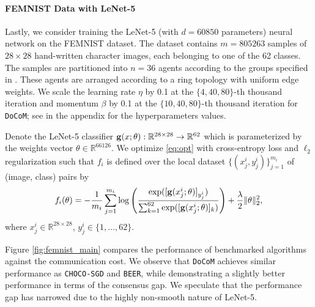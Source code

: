 \documentclass[10pt]{article} %
\newcommand{\revision}{}
\theoremstyle{plain}
\theoremstyle{definition}
\theoremstyle{remark}
\newcommand{\aname}{{\tt DoCoM}}
\begin{document}
\paragraph{FEMNIST Data with LeNet-5}
Lastly, we consider training the LeNet-5 (with $d=60850$ parameters) neural network on the FEMNIST dataset. The dataset contains $m=805263$ samples of $28 \times 28$ hand-written character images, each belonging to one of the 62 classes. The samples are partitioned into $n=36$ agents according to the groups specified in \citep{caldas2019leaf}. These agents are arranged according to a ring topology with uniform edge weights.
We scale the learning rate $\eta$ by 0.1 at the {\revision $\{4, 40, 80\}$-th} thousand iteration and momentum $\beta$ by 0.1 at the {\revision $\{10, 40, 80 \}$-th} thousand iteration {\revision for {\aname}}; see  in the appendix for the hyperparameters values.\vspace{-.1cm}

{\revision
Denote the LeNet-5 classifier ${\bf g} (x; \theta): \mathbb{R}^{28\times 28} \rightarrow \mathbb{R}^{62}$ which is parameterized by the weights vector $\theta \in \mathbb{R}^{66126}$. We optimize \eqref{eq:opt} with cross-entropy loss and $\ell_2$ regularization such that $f_i$ is defined over the local dataset $\{(x_j^i,y_j^i) \}_{j=1}^{m_i}$ of (image, class) pairs by
\begin{equation}
    f_i(\theta) = - \frac{1}{m_i} \sum_{j=1}^{m_i} \log\left(\frac{\exp( [{\bf g} (x_j^i; \theta) ]_{y_j^i})}{\sum_{k=1}^{62} \exp( [ {\bf g} (x_j^i; \theta) ]_k )} \right) + \frac{\lambda}{2} \| \theta\|_2^2,
\end{equation}
where $x_j^i \in \mathbb{R}^{28 \times 28}$, $y_j^i \in \{1, \ldots ,62\}$.
}

Figure \ref{fig:femnist_main} compares the performance of benchmarked algorithms against the communication cost. We observe that {\aname} achieves similar performance as {\tt CHOCO-SGD} and {\tt BEER}, while demonstrating a slightly better performance in terms of the consensus gap. 
We speculate that the performance gap has narrowed due to the highly non-smooth nature of LeNet-5. 
\end{document}
